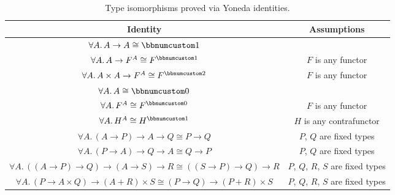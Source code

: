 \begin{table}[h]
\begin{centering}
\begin{tabular}{|c|c|}
\hline 
\textbf{\footnotesize{}Identity} & \textbf{\footnotesize{}Assumptions}\tabularnewline
\hline 
\hline 
{\footnotesize{}$\forall A.\,A\rightarrow A\cong\bbnum 1$} & \tabularnewline
\hline 
{\footnotesize{}$\forall A.\,A\rightarrow F^{A}\cong F^{\bbnum 1}$} & {\footnotesize{}$F$ is any functor}\tabularnewline
\hline 
{\footnotesize{}$\forall A.\,A\times A\rightarrow F^{A}\cong F^{\bbnum 2}$} & {\footnotesize{}$F$ is any functor}\tabularnewline
\hline 
{\footnotesize{}$\forall A.\,A\cong\bbnum 0$} & \tabularnewline
\hline 
{\footnotesize{}$\forall A.\,F^{A}\cong F^{\bbnum 0}$} & {\footnotesize{}$F$ is any functor}\tabularnewline
\hline 
{\footnotesize{}$\forall A.\,H^{A}\cong H^{\bbnum 1}$} & {\footnotesize{}$H$ is any contrafunctor}\tabularnewline
\hline 
{\footnotesize{}$\forall A.\,(A\rightarrow P)\rightarrow A\rightarrow Q\cong P\rightarrow Q$} & {\footnotesize{}$P$, $Q$ are fixed types}\tabularnewline
\hline 
{\footnotesize{}$\forall A.\,(P\rightarrow A)\rightarrow Q\rightarrow A\cong Q\rightarrow P$} & {\footnotesize{}$P$, $Q$ are fixed types}\tabularnewline
\hline 
{\footnotesize{}$\forall A.\,((A\rightarrow P)\rightarrow Q)\rightarrow(A\rightarrow S)\rightarrow R\cong((S\rightarrow P)\rightarrow Q)\rightarrow R$} & {\footnotesize{}$P$, $Q$, $R$, $S$ are fixed types}\tabularnewline
\hline 
{\footnotesize{}$\forall A.\,(P\rightarrow A\times Q)\rightarrow(A+R)\times S\cong$$(P\rightarrow Q)\rightarrow(P+R)\times S$} & {\footnotesize{}$P$, $Q$, $R$, $S$ are fixed types}\tabularnewline
\hline 
\end{tabular}
\par\end{centering}
\caption{Type isomorphisms proved via Yoneda identities.\label{tab:Type-identities-proved-by-Yoneda}}
\end{table}

